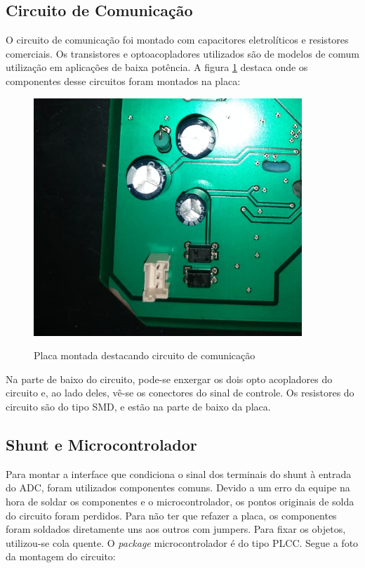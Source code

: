 \subsection{Circuito de Comunicação}
O circuito de comunicação foi montado com capacitores eletrolíticos e resistores comerciais. Os transistores e optoacopladores utilizados são de modelos de comum utilização em aplicações de baixa potência. A figura \ref{fig:figura-montagem-comm} destaca onde os componentes desse circuitos foram montados na placa:

\begin{figure}[H]
    \centering
    \caption{Placa montada destacando circuito de comunicação}
    \includegraphics[width=0.9\textwidth]{./dados/figuras/placa_comm.png}
    \label{fig:figura-montagem-comm}
\end{figure}

Na parte de baixo do circuito, pode-se enxergar os dois opto acopladores do circuito e, ao lado deles, vê-se os conectores do sinal de controle. Os resistores do circuito são do tipo SMD, e estão na parte de baixo da placa.

\subsection{Shunt e Microcontrolador}
Para montar a interface que condiciona o sinal dos terminais do shunt à entrada do ADC, foram utilizados componentes comuns. Devido a um erro da equipe na hora de soldar os componentes e o microcontrolador, os pontos originais de solda do circuito foram perdidos. Para não ter que refazer a placa, os componentes foram soldados diretamente uns aos outros com jumpers. Para fixar os objetos, utilizou-se cola quente. O \textit{package} microcontrolador é do tipo PLCC. Segue a foto da montagem do circuito:

